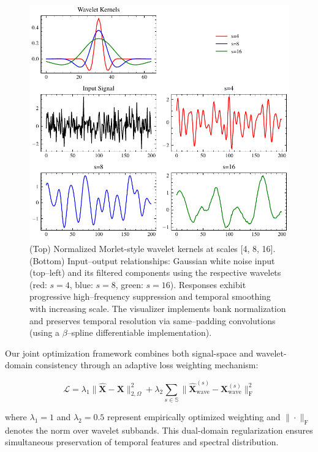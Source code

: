 \documentclass[conference]{IEEEtran}
\begin{document}
\begin{figure}[tb]
    \centering
    \includegraphics[width=\linewidth]{wavelet-transform.pdf}
    \caption{(Top) Normalized Morlet-style wavelet kernels at scales [4, 8, 16]. (Bottom) Input–output relationships: Gaussian white noise input (top–left) and its filtered components using the respective wavelets (red: $s=4$, blue: $s=8$, green: $s=16$). Responses exhibit progressive high–frequency suppression and temporal smoothing with increasing scale. The visualizer implements bank normalization and preserves temporal resolution via same–padding convolutions (using a $\beta$–spline differentiable implementation).}

    \label{fig:wavelet-transform}
\end{figure}

Our joint optimization framework combines both signal-space and wavelet-domain consistency through an adaptive loss weighting mechanism:

\begin{equation}
    \mathcal{L} = \lambda_1\|\mathbf{\hat{X}} - \mathbf{X}\|_{2,\Omega}^2 + \lambda_2\sum_{s\in\mathbb{S}} \|\mathbf{\hat{X}}_{\text{wave}}^{(s)} - \mathbf{X}_{\text{wave}}^{(s)}\|_{\text{F}}^2
\end{equation}

where $\lambda_1=1$ and $\lambda_2=0.5$ represent empirically optimized weighting and $\|\cdot\|_{\text{F}}$ denotes the norm over wavelet subbands. This dual-domain regularization ensures simultaneous preservation of  temporal features and spectral distribution.
\end{document}
